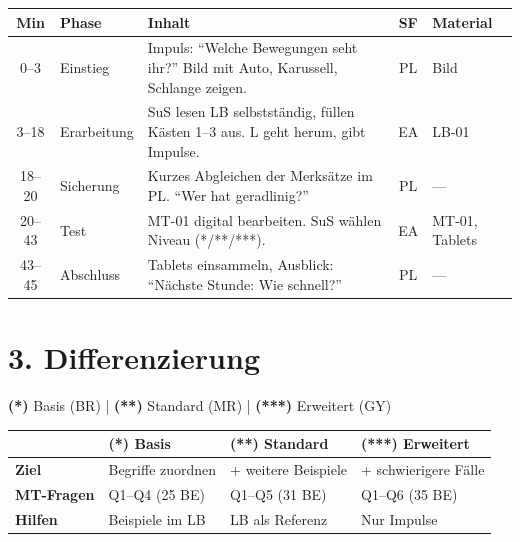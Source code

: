 \documentclass[11pt, a4paper]{article}
\newcommand{\sternEins}{\textcolor{basis}{\textbf{(*)}}}
\newcommand{\sternZwei}{\textcolor{standard}{\textbf{(**)}}}
\newcommand{\sternDrei}{\textcolor{erweiterung}{\textbf{(***)}}}
\begin{document}
\begin{longtable}{|c|p{2cm}|p{6.5cm}|c|p{2cm}|}
\hline
\textbf{Min} & \textbf{Phase} & \textbf{Inhalt} & \textbf{SF} & \textbf{Material} \\
\hline
\endhead

0--3 & Einstieg & Impuls: ``Welche Bewegungen seht ihr?'' Bild mit Auto, Karussell, Schlange zeigen. & PL & Bild \\
\hline

3--18 & Erarbeitung & SuS lesen LB selbstständig, füllen Kästen 1--3 aus. L geht herum, gibt Impulse. & EA & LB-01 \\
\hline

18--20 & Sicherung & Kurzes Abgleichen der Merksätze im PL. ``Wer hat geradlinig?'' & PL & --- \\
\hline

20--43 & Test & MT-01 digital bearbeiten. SuS wählen Niveau (*/\!**/\!***). & EA & MT-01, Tablets \\
\hline

43--45 & Abschluss & Tablets einsammeln, Ausblick: ``Nächste Stunde: Wie schnell?'' & PL & --- \\
\hline
\end{longtable}


\section*{3. Differenzierung}

\begin{infobox}[Legende]
\sternEins{} Basis (BR) | \sternZwei{} Standard (MR) | \sternDrei{} Erweitert (GY)
\end{infobox}

\vspace{0.5em}

\begin{tabular}{|l|p{3.5cm}|p{3.5cm}|p{4cm}|}
\hline
& \sternEins{} \textbf{Basis} & \sternZwei{} \textbf{Standard} & \sternDrei{} \textbf{Erweitert} \\
\hline
\textbf{Ziel} & Begriffe zuordnen & + weitere Beispiele & + schwierigere Fälle \\
\hline
\textbf{MT-Fragen} & Q1--Q4 (25 BE) & Q1--Q5 (31 BE) & Q1--Q6 (35 BE) \\
\hline
\textbf{Hilfen} & Beispiele im LB & LB als Referenz & Nur Impulse \\
\hline
\end{tabular}
\end{document}
